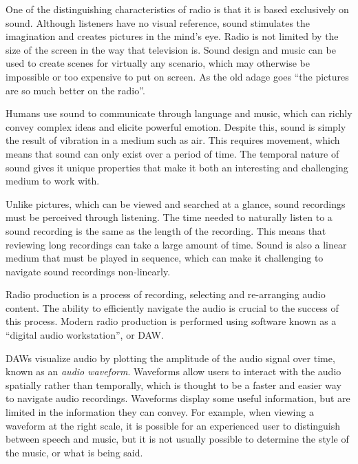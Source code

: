 One of the distinguishing characteristics of radio is that it is based exclusively on sound.  Although listeners have
no visual reference, sound stimulates the imagination and creates pictures in the mind's eye.  Radio is not limited
by the size of the screen in the way that television is. Sound design and music can be used to create scenes for
virtually any scenario, which may otherwise be impossible or too expensive to put on screen. As the old adage goes
``the pictures are so much better on the radio''.

Humans use sound to communicate through language and music, which can richly convey complex ideas and elicite powerful
emotion. Despite this, sound is simply the result of vibration in a medium such as air.  This requires movement, which
means that sound can only exist over a period of time. The temporal nature of sound gives it unique properties that
make it both an interesting and challenging medium to work with.

Unlike pictures, which can be viewed and searched at a glance, sound recordings must be perceived through listening.
The time needed to naturally listen to a sound recording is the same as the length of the recording. This means that
reviewing long recordings can take a large amount of time. Sound is also a linear medium that must be played in
sequence, which can make it challenging to navigate sound recordings non-linearly. 


Radio production is a process of recording, selecting and re-arranging audio content. The ability to efficiently
navigate the audio is crucial to the success of this process.  Modern radio production is performed using software
known as a ``digital audio workstation'', or DAW.


DAWs visualize audio by plotting the amplitude of the audio signal over time, known as an \textit{audio waveform}.
Waveforms allow users to interact with the audio spatially rather than temporally, which is thought to be a faster and
easier way to navigate audio recordings.  Waveforms display some useful information, but are limited in the information
they can convey.  For example, when viewing a waveform at the right scale, it is possible for an experienced user to
distinguish between speech and music, but it is not usually possible to determine the style of the music, or what is
being said.

